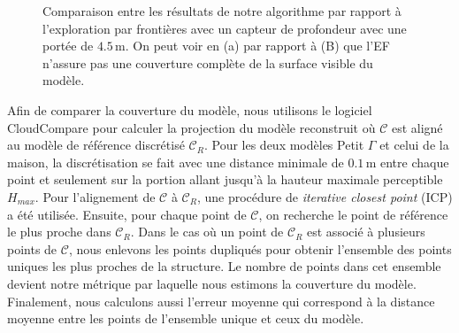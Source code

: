 \begin{figure}[H]
  \centering
{}
\hfil
{}
\hfil
{}
\caption[Notre algorithme vs l'exploration par frontières]{ Comparaison entre les résultats de notre algorithme par rapport à l'exploration par frontières avec un capteur de profondeur avec une portée de $4.5\, \mathrm{m}$. On peut voir en (a) par rapport à (B) que l'EF n'assure pas une couverture complète de la surface visible du modèle.
}
\label{fig:simulation FBE}
\end{figure}

Afin de comparer la couverture du modèle, nous utilisons le logiciel CloudCompare pour calculer la projection du modèle reconstruit où $\mathcal C$ est aligné au modèle de référence discrétisé $\mathcal C_R$. Pour les deux modèles Petit $\Gamma$ et celui de la maison, la discrétisation se fait avec une distance minimale de $0.1\, \mathrm{m}$ entre chaque point et seulement sur la portion allant jusqu'à la hauteur maximale perceptible $H_{max}$. Pour l'alignement de $\mathcal C$  à $\mathcal C_R$, une procédure de \textit{iterative closest point} (ICP) \citep{Rusinkiewicz2001} a été utilisée. Ensuite, pour chaque point de $\mathcal C$, on recherche le point de référence le plus proche dans $\mathcal C_R$. Dans le cas où un point de $\mathcal C_R$ est associé à plusieurs points de $\mathcal C$, nous enlevons les points dupliqués pour obtenir l'ensemble des points uniques les plus proches de la structure. Le nombre de points dans cet ensemble devient notre métrique par laquelle nous estimons la couverture du modèle. Finalement, nous calculons aussi l'erreur moyenne qui correspond à la distance moyenne entre les points de l'ensemble unique et ceux du modèle.


